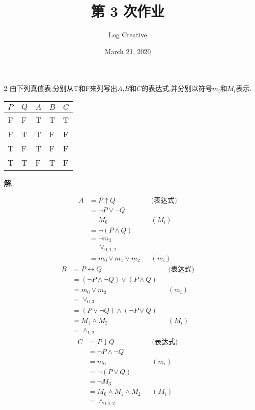 \documentclass[12pt]{article}
\title{第 3 次作业}
\author{Log Creative}
\date{March 21, 2020}
\newenvironment{firstlayer}%
{\begin{list}{}{\renewcommand{\makelabel}[1]{\textbf{##1}.\hfil}
}}
{\end{list}}
\begin{document}
\begin{CJK}{UTF8}{gbsn}

\maketitle

\begin{firstlayer}
  \item[2] 由下列真值表,分别从T和F来列写出\(A\),\(B\)和\(C\)的表达式,并分别以符号\(m_i\)和\(M_i\)表示.
\begin{longtable}[]{@{}lllll@{}}
\toprule
\(P\) & \(Q\) & \(A\) & \(B\) & \(C\)\tabularnewline
\midrule
\endhead
F & F & T & T & T\tabularnewline
F & T & T & F & F\tabularnewline
T & F & T & F & F\tabularnewline
T & T & F & T & F\tabularnewline
\bottomrule
\end{longtable}

\textbf{解}.

\begin{align}
  A&=P\uparrow Q && \text{(表达式)} \nonumber \\
  &=\neg P \vee \neg Q \nonumber \\
  &=M_0 && (M_i) \nonumber \\
  &=\neg(P\wedge Q) \nonumber \\
  &=\neg m_3 \nonumber \\
  &=\vee_{0,1,2} \nonumber \\
  &=m_0\vee m_1 \vee m_2 && (m_i) 
\end{align}
\begin{align}
  B&=P\leftrightarrow Q && \text{(表达式)} \nonumber\\
  &=(\neg P \wedge \neg Q)\vee (P \wedge Q)  \nonumber \\
  &=m_0\vee m_3 && (m_i) \nonumber \\
  &=\vee_{0,3}\nonumber \\
  &=(P \vee \neg Q)\wedge (\neg P\vee Q) \nonumber \\
  &=M_1\wedge M_2 && (M_i) \\
  &=\wedge_{1,2} \nonumber 
\end{align}
\begin{align}
  C&=P\downarrow Q && \text{(表达式)} \nonumber\\
  &=\neg P\wedge \neg Q \nonumber \\
  &=m_0 && (m_i) \nonumber \\
  &=\neg (P\vee Q) \nonumber \\
  &=\neg M_3 \nonumber \\
  &=M_0\wedge M_1 \wedge M_2 && (M_i) \\
  &=\wedge_{0,1,2} \nonumber 
\end{align}


\end{firstlayer}
\end{CJK}
\end{document}
